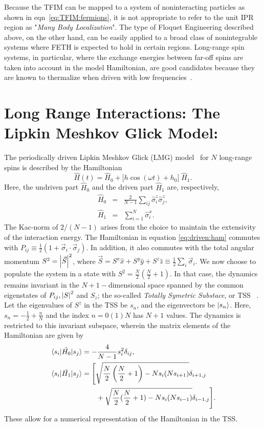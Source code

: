 \documentclass[%
reprint,
superscriptaddress,
amsmath,amssymb,
aps,
prb,
showkeys,
]{revtex4-2}
\begin{document}
{Because the TFIM can be mapped to a system of noninteracting particles as shown in eqn}~\ref{eq:TFIM:fermions}, it is not appropriate to refer to the unit IPR region as "\emph{Many Body Localization}". The type of Floquet Engineering described above, on the other hand, can be easily applied to a broad class of nonintegrable systems where FETH is expected to hold in certain regions. Long-range spin systems, in particular, where the exchange energies between far-off spins are taken into account in the model Hamiltonian, are good candidates because they are known to thermalize when driven with low frequencies~\cite{russomanno_thermalization_2015}.
\section{\label{sec:level3}Long Range Interactions: The Lipkin Meshkov Glick Model: }	
The periodically driven {Lipkin Meshkov Glick (LMG)} model~\cite{lmg1965_1,defenu2018} for $N$ long-range spins is described by the Hamiltonian
\begin{equation}
	\hat{H}(t) = \hat{H}_0 + \big[h \cos{(\omega t)} + h_0\big]\; \hat{H}_1.
	\label{eq:driven:ham}
\end{equation}
Here, the undriven part $\hat{H}_0$ and the driven part $\hat{H}_1$ are, respectively, 
\begin{eqnarray}
	\hat{H}_0 &=& \frac{2}{N-1} \sum_{ij}\hat{\sigma}^z_i\hat{\sigma}^z_j,\nonumber \\
	\hat{H}_1 &=& \sum^N_{i=1}\hat{\sigma}^x_i.
	\label{eq:h0h1}
\end{eqnarray}
{The Kac-norm of $2/(N-1)$ arises from the choice to maintain the extensivity of the interaction energy}. The Hamiltonian in equation \ref{eq:driven:ham} commutes with $P_{ij} \equiv \displaystyle\frac{1}{2}\left(1+ \vec{\sigma}_i\cdot\vec{\sigma}_j\right)$. In addition, it also commutes with the total angular momentum $S^2 = \abs{\vec{S}}^2$, where $\vec{S}=S^x\hat{x}+S^y\hat{y}+S^z\hat{z}\equiv\frac12 \sum_i \vec{\sigma}_i$. We now choose to populate the system in a state with $S^2=\displaystyle\frac{N}{2}\left(\frac{N}{2}+1\right)$. In that case, the dynamics remains invariant in the  $N+1-$dimensional space spanned by the common eigenstates of $P_{ij}, \abs{S}^2$ and $S_z$; the so-called \textit{ Totally Symetric Substace}, or TSS ~\cite{mori_prethermalization_2019}. Let the eigenvalues of $S^z$ in the TSS be $s_n$, and the eigenvectors be $\ket{s_n}$. Here, $s_n=-\frac{1}{2}+\frac{n}{N}$ and the index
$n= 0 (1) N$ has $N+1$ values. The dynamics is restricted to this invariant subspace, wherein the matrix elements of the Hamiltonian are given by
\begin{align}
	\mel{s_i}{\hat{H_0}}{s_j} &= -\frac{4}{N-1} s^2_i \delta_{ij},\nonumber\\
	\mel{s_i}{\hat{H_1}}{s_j} &= \Bigg[\sqrt{\frac{N}{2}\left(\frac{N}{2}+1\right) - Ns_i(Ns_{i + 1})}\delta_{i+1, j} \nonumber\\ 
	&\hskip 0.7cm +\sqrt{\frac{N}{2}(\frac{N}{2}+1) - Ns_i(Ns_{i- 1})}\delta_{i-1,j}\Bigg].
	\label{eq:lmg:tssham}
\end{align}
These allow for a numerical representation of the Hamiltonian in the TSS.
\end{document}
